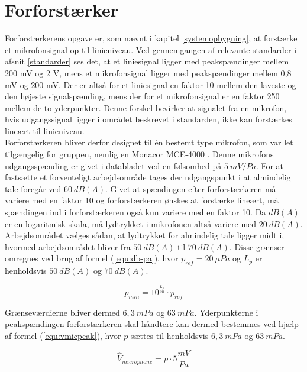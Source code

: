 \chapter{Forforstærker}
\label{forforstaerker}
Forforstærkerens opgave er, som nævnt i kapitel \ref{systemopbygning}, at forstærke et mikrofonsignal op til linieniveau. Ved gennemgangen af relevante standarder i afsnit \ref{standarder} ses det, at et liniesignal ligger med peakspændinger mellem 200 mV og 2 V, mens et mikrofonsignal ligger med peakspændinger mellem 0,8 mV og 200 mV. Der er altså for et liniesignal en faktor 10 mellem den laveste og den højeste signalspænding, mens der for et mikrofonsignal er en faktor 250 mellem de to yderpunkter. Denne forskel bevirker at signalet fra en mikrofon, hvis udgangssignal ligger i området beskrevet i standarden, ikke kan forstærkes lineært til linieniveau.\\ 
Forforstærkeren bliver derfor designet til én bestemt type mikrofon, som var let tilgængelig for gruppen, nemlig en Monacor MCE-4000 . Denne mikrofons udgangsspænding er givet i databladet ved en følsomhed på $5~mV/Pa$. For at fastsætte et forventeligt arbejdsområde tages der udgangspunkt i at almindelig tale foregår ved $60~dB(A)$. Givet at spændingen efter forforstærkeren må variere med en faktor 10 og forforstærkeren ønskes at forstærke lineært, må spændingen ind i forforstærkeren også kun variere med en faktor 10. Da $dB(A)$ er en logaritmisk skala, må lydtrykket i mikrofonen altså variere med $20~dB(A)$. Arbejdsområdet vælges sådan, at lydtrykket for almindelig tale ligger midt i, hvormed arbejdsområdet bliver fra $50~dB(A)$ til $70~dB(A)$. Disse grænser omregnes ved brug af formel (\ref{equ:db-pa}), hvor $p_{ref} = 20~\mu Pa$ og $L_p$  er henholdsvis $50~dB(A)$ og $70~dB(A)$. 

\begin{equation}
\label{equ:db-pa}
p_{min} = 10^{\frac{L_p}{20}} \cdot p_{ref}
\end{equation}

Grænseværdierne bliver dermed $6,3~mPa$ og $63~mPa$. Yderpunkterne i peakspændingen forforstærkeren skal håndtere kan dermed bestemmes ved hjælp af formel (\ref{equ:vmicpeak}), hvor $p$ sættes til henholdsvis $6,3~mPa$ og $63~mPa$.

\begin{equation}
\label{equ:vmicpeak}
\hat{V}_{microphone} = p \cdot 5\frac{mV}{Pa}
\end{equation}

